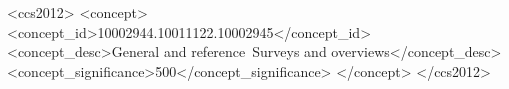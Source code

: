 
\begin{CCSXML}
    <ccs2012>
    <concept>
        <concept_id>10002944.10011122.10002945</concept_id>
        <concept_desc>General and reference~Surveys and overviews</concept_desc>
        <concept_significance>500</concept_significance>
    </concept>
    </ccs2012>
\end{CCSXML}


